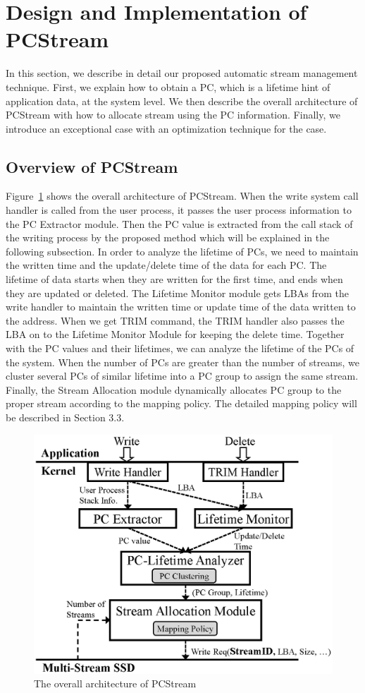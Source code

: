 \section{Design and Implementation of PCStream}
In this section, we describe in detail our proposed automatic stream management technique.
First, we explain how to obtain a PC, which is a lifetime hint of application data, at the system level. 
We then describe the overall architecture of PCStream with how to allocate stream using the PC information. 
Finally, we introduce an exceptional case with an optimization technique for the case.

\subsection{Overview of PCStream}
Figure~\ref{fig:architecture} shows the overall architecture of PCStream.
When the write system call handler is called from the user process,
it passes the user process information to the PC Extractor module.
Then the PC value is extracted from the call stack of the writing process
by the proposed method which will be explained in the following subsection.
In order to analyze the lifetime of PCs,
we need to maintain the written time and the update/delete time of the data for each PC.
The lifetime of data starts when they are written for the first time, 
and ends when they are updated or deleted.
The Lifetime Monitor module gets LBAs from the write handler to 
maintain the written time or update time of the data written to the address.
When we get TRIM command, the TRIM handler also passes the LBA on to the Lifetime Monitor Module
for keeping the delete time.
Together with the PC values and their lifetimes, we can analyze the 
lifetime of the PCs of the system.
When the number of PCs are greater than the number of streams,
we cluster several PCs of similar lifetime into a PC group 
to assign the same stream.
Finally, the Stream Allocation module dynamically allocates PC group
to the proper stream according to the mapping policy.
The detailed mapping policy will be described in Section 3.3.

\begin{figure}[t]
	\centering
	\includegraphics[width=0.8\linewidth]{figure/architecture}
	\caption{The overall architecture of PCStream}
	\label{fig:architecture}
	\vspace{-20pt}
\end{figure}




